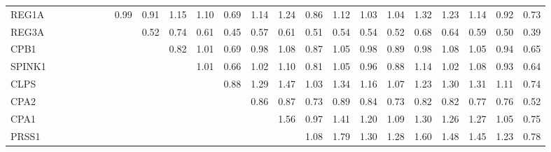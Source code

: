 \begin{longtable}{lrrrrrrrrrrrrrrrrrrrrrr}
REG1A    &              &              &              &             &             &             &        0.99 &       0.91 &         1.15 &       1.10 &       0.69 &       1.14 &        1.24 &      0.86 &        1.12 &           1.03 &          1.04 &      1.32 &        1.23 &        1.14 &       0.92 &       0.73 \\
REG3A    &              &              &              &             &             &             &             &       0.52 &         0.74 &       0.61 &       0.45 &       0.57 &        0.61 &      0.51 &        0.54 &           0.54 &          0.52 &      0.68 &        0.64 &        0.59 &       0.50 &       0.39 \\
CPB1     &              &              &              &             &             &             &             &            &         0.82 &       1.01 &       0.69 &       0.98 &        1.08 &      0.87 &        1.05 &           0.98 &          0.89 &      0.98 &        1.08 &        1.05 &       0.94 &       0.65 \\
SPINK1   &              &              &              &             &             &             &             &            &              &       1.01 &       0.66 &       1.02 &        1.10 &      0.81 &        1.05 &           0.96 &          0.88 &      1.14 &        1.02 &        1.08 &       0.93 &       0.64 \\
CLPS     &              &              &              &             &             &             &             &            &              &            &       0.88 &       1.29 &        1.47 &      1.03 &        1.34 &           1.16 &          1.07 &      1.23 &        1.30 &        1.31 &       1.11 &       0.74 \\
CPA2     &              &              &              &             &             &             &             &            &              &            &            &       0.86 &        0.87 &      0.73 &        0.89 &           0.84 &          0.73 &      0.82 &        0.82 &        0.77 &       0.76 &       0.52 \\
CPA1     &              &              &              &             &             &             &             &            &              &            &            &            &        1.56 &      0.97 &        1.41 &           1.20 &          1.09 &      1.30 &        1.26 &        1.27 &       1.05 &       0.75 \\
PRSS1    &              &              &              &             &             &             &             &            &              &            &            &            &             &      1.08 &        1.79 &           1.30 &          1.28 &      1.60 &        1.48 &        1.45 &       1.23 &       0.78 \\

\end{longtable}
